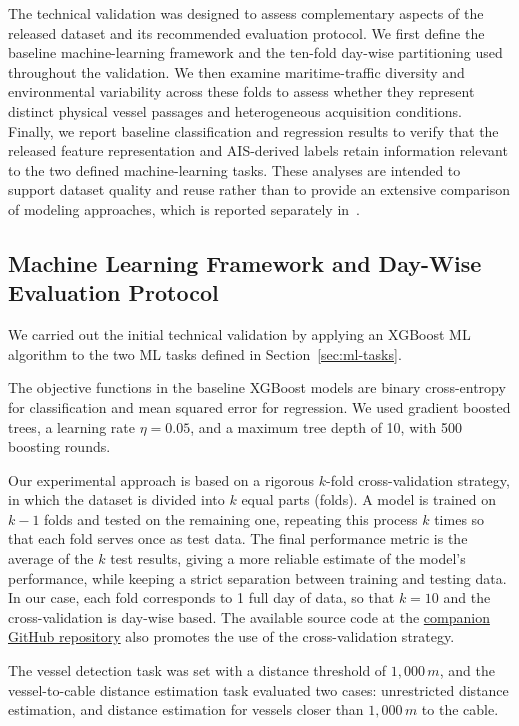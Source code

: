 \documentclass[11pt]{article}
\begin{document}
The technical validation was designed to assess complementary aspects of the released dataset and its recommended evaluation protocol. We first define the baseline machine-learning framework and the ten-fold day-wise partitioning used throughout the validation. We then examine maritime-traffic diversity and environmental variability across these folds to assess whether they represent distinct physical vessel passages and heterogeneous acquisition conditions. Finally, we report baseline classification and regression results to verify that the released feature representation and AIS-derived labels retain information relevant to the two defined machine-learning tasks. These analyses are intended to support dataset quality and reuse rather than to provide an extensive comparison of modeling approaches, which is reported separately in~\cite{RamirezTorres2026VesselDAS}.

\subsection{Machine Learning Framework and Day-Wise Evaluation Protocol}
\label{sec:machine learning framework}

We carried out the initial technical validation by applying an XGBoost ML algorithm to the two ML tasks defined in Section~\ref{sec:ml-tasks}.

The objective functions in the baseline XGBoost models are binary cross-entropy for classification and mean squared error for regression. We used gradient boosted trees, a learning rate $\eta = 0.05$, and a maximum tree depth of 10, with 500 boosting rounds.

Our experimental approach is based on a rigorous $k$-fold cross-validation strategy, in which the dataset is divided into $k$ equal parts (folds). A model is trained on $k-1$ folds and tested on the remaining one, repeating this process $k$ times so that each fold serves once as test data. The final performance metric is the average of the $k$ test results, giving a more reliable estimate of the model's performance, while keeping a strict separation between training and testing data. In our case, each fold corresponds to 1 full day of data, so that $k=10$ and the cross-validation is day-wise based. The available source code at the \href{https://github.com/UAH-PSI/das-vessel-detection}{companion GitHub repository} also promotes the use of the cross-validation strategy.

The vessel detection task was set with a distance threshold of $1{,}000\,m$, and the vessel-to-cable distance estimation task evaluated two cases: unrestricted distance estimation, and distance estimation for vessels closer than $1{,}000\,m$ to the cable.
\end{document}
